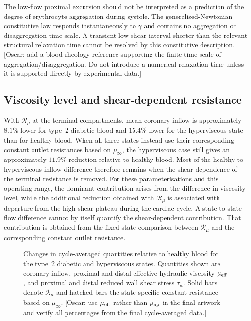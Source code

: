 \documentclass[lineno]{jfm}
\begin{document}
The low-flow proximal excursion should not be interpreted as a prediction of
the degree of erythrocyte aggregation during systole. The
generalised-Newtonian constitutive law responds instantaneously to
$\dot{\gamma}$ and contains no aggregation or disaggregation time scale.
A transient low-shear interval shorter than the relevant structural relaxation
time cannot be resolved by this constitutive description.
{\color{red}[Oscar: add a blood-rheology reference supporting the finite
time scale of aggregation/disaggregation. Do not introduce a numerical
relaxation time unless it is supported directly by experimental data.]}
\subsection{Viscosity level and shear-dependent resistance}
\label{sec:results-state-vs-sheardependence}
With $\mathcal{R}_{\mu}$ at the terminal compartments, mean coronary inflow is
approximately $8.1\%$ lower for type~2 diabetic blood and $15.4\%$ lower for
the hyperviscous state than for healthy blood. When all three states instead
use their corresponding constant outlet resistances based on $\mu_\infty$, the
hyperviscous case still gives an approximately $11.9\%$ reduction relative to
healthy blood.
Most of the healthy-to-hyperviscous inflow difference therefore remains when
the shear dependence of the terminal resistance is removed. For these
parameterisations and this operating range, the dominant contribution arises
from the difference in viscosity level, while the additional reduction obtained
with $\mathcal{R}_{\mu}$ is associated with departure from the high-shear
plateau during the cardiac cycle.
A state-to-state flow difference cannot by itself quantify the
shear-dependent contribution. That contribution is obtained from the
fixed-state comparison between $\mathcal{R}_{\mu}$ and the corresponding
constant outlet resistance.
\begin{figure}
    \centering
    \fbox{
    \rule{0pt}{0.30\textheight}
    \rule{0.92\textwidth}{0pt}
    }
    \caption{Changes in cycle-averaged quantities relative to healthy blood for
    the type~2 diabetic and hyperviscous states. Quantities shown are coronary
    inflow, proximal and distal effective hydraulic viscosity
    $\mu_{\rm eff}$, and proximal and distal reduced wall shear stress
    $\tau_w$. Solid bars denote $\mathcal{R}_{\mu}$ and hatched bars the
    state-specific constant resistance based on $\mu_\infty$.
    {\color{red}[Oscar: use $\mu_{\rm eff}$ rather than $\mu_{\rm ap}$ in the
    final artwork and verify all percentages from the final cycle-averaged
    data.]}}
    \label{fig:state-cycle-averages}
\end{figure}
\end{document}
